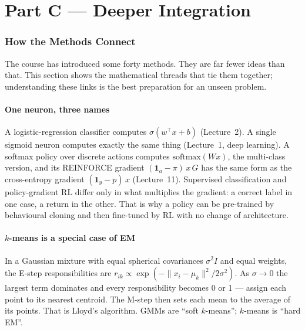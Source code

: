 \documentclass[11pt]{article}
\begin{document}
\clearpage
\part*{Part C --- Deeper Integration}

\section{How the Methods Connect}
The course has introduced some forty methods. They are far fewer ideas than that. This section shows the mathematical threads that tie them together; understanding these links is the best preparation for an unseen problem.

\subsection{One neuron, three names}
A logistic-regression classifier computes $\sigma(w^\top x+b)$ (Lecture~2). A single sigmoid neuron computes exactly the same thing (Lecture~1, deep learning). A softmax policy over discrete actions computes $\text{softmax}(Wx)$, the multi-class version, and its REINFORCE gradient $(\mathbf 1_a-\pi)\,x\,G$ has the same form as the cross-entropy gradient $(\mathbf 1_y-p)\,x$ (Lecture~11). Supervised classification and policy-gradient RL differ only in what multiplies the gradient: a correct label in one case, a return in the other. That is why a policy can be pre-trained by behavioural cloning and then fine-tuned by RL with no change of architecture.

\subsection{$k$-means is a special case of EM}
In a Gaussian mixture with equal spherical covariances $\sigma^2I$ and equal weights, the E-step responsibilities are $r_{ik}\propto\exp(-\|x_i-\mu_k\|^2/2\sigma^2)$. As $\sigma\to0$ the largest term dominates and every responsibility becomes 0 or 1 --- assign each point to its nearest centroid. The M-step then sets each mean to the average of its points. That is Lloyd's algorithm. GMMs are ``soft $k$-means''; $k$-means is ``hard EM''.
\end{document}
